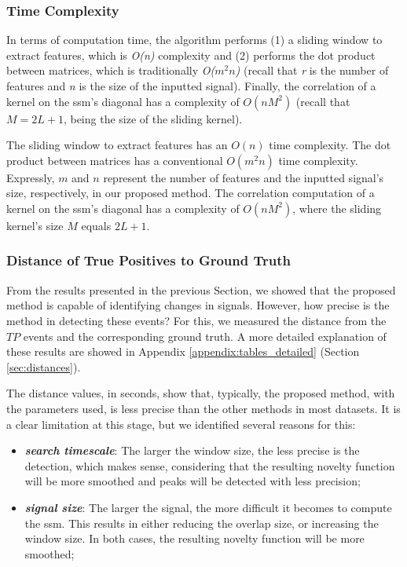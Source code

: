 \subsubsection{Time Complexity}
\label{sec:time_complexity}

In terms of computation time, the algorithm performs (1) a sliding window to extract features, which is \textit{O(n)} complexity and (2) performs the dot product between matrices, which is traditionally \textit{O($m^2n$)} (recall that \textit{r} is the number of features and \textit{n} is the size of the inputted signal). Finally, the correlation of a kernel on the \gls{ssm}'s diagonal has a complexity of $O(nM^2)$ (recall that $M=2L+1$, being the size of the sliding kernel).

The sliding window to extract features has an $O(n)$ time complexity. The dot product between matrices has a conventional $O(m^2n)$ time complexity. Expressly, $m$ and $n$ represent the number of features and the inputted signal's size, respectively, in our proposed method. The correlation computation of a kernel on the \gls{ssm}'s diagonal has a complexity of $O(nM^2)$, where the sliding kernel's size $M$ equals $2L+1$.

\subsubsection{Distance of True Positives to Ground Truth}
\label{sec:distance_intro}

From the results presented in the previous Section, we showed that the proposed method is capable of identifying changes in signals. However, how precise is the method in detecting these events? For this, we measured the distance from the $TP$ events and the corresponding ground truth. A more detailed explanation of these results are showed in Appendix \ref{appendix:tables_detailed} (Section \ref{sec:distances}).

The distance values, in seconds, show that, typically, the proposed method, with the parameters used, is less precise than the other methods in most datasets. It is a clear limitation at this stage, but we identified several reasons for this:

\begin{itemize}

\item \textbf{\textit{search timescale}}: The larger the window size, the less precise is the detection, which makes sense, considering that the resulting novelty function will be more smoothed and peaks will be detected with less precision;

\item \textbf{\textit{signal size}}: The larger the signal, the more difficult it becomes to compute the \gls{ssm}. This results in either reducing the overlap size, or increasing the window size. In both cases, the resulting novelty function will be more smoothed;

\end{itemize}

